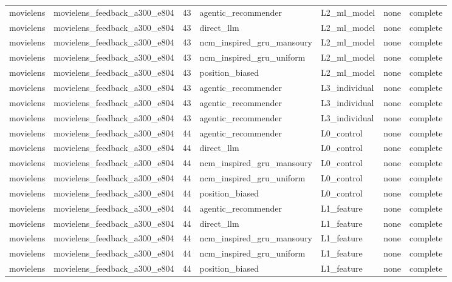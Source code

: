 \begin{table}[htbp!]
\begin{tabular}{llrllll}
movielens & movielens\_feedback\_a300\_e804 & 43 & agentic\_recommender & L2\_ml\_model & none & complete \\
movielens & movielens\_feedback\_a300\_e804 & 43 & direct\_llm & L2\_ml\_model & none & complete \\
movielens & movielens\_feedback\_a300\_e804 & 43 & ncm\_inspired\_gru\_mansoury & L2\_ml\_model & none & complete \\
movielens & movielens\_feedback\_a300\_e804 & 43 & ncm\_inspired\_gru\_uniform & L2\_ml\_model & none & complete \\
movielens & movielens\_feedback\_a300\_e804 & 43 & position\_biased & L2\_ml\_model & none & complete \\
movielens & movielens\_feedback\_a300\_e804 & 43 & agentic\_recommender & L3\_individual & none & complete \\
movielens & movielens\_feedback\_a300\_e804 & 43 & agentic\_recommender & L3\_individual & none & complete \\
movielens & movielens\_feedback\_a300\_e804 & 43 & agentic\_recommender & L3\_individual & none & complete \\
movielens & movielens\_feedback\_a300\_e804 & 44 & agentic\_recommender & L0\_control & none & complete \\
movielens & movielens\_feedback\_a300\_e804 & 44 & direct\_llm & L0\_control & none & complete \\
movielens & movielens\_feedback\_a300\_e804 & 44 & ncm\_inspired\_gru\_mansoury & L0\_control & none & complete \\
movielens & movielens\_feedback\_a300\_e804 & 44 & ncm\_inspired\_gru\_uniform & L0\_control & none & complete \\
movielens & movielens\_feedback\_a300\_e804 & 44 & position\_biased & L0\_control & none & complete \\
movielens & movielens\_feedback\_a300\_e804 & 44 & agentic\_recommender & L1\_feature & none & complete \\
movielens & movielens\_feedback\_a300\_e804 & 44 & direct\_llm & L1\_feature & none & complete \\
movielens & movielens\_feedback\_a300\_e804 & 44 & ncm\_inspired\_gru\_mansoury & L1\_feature & none & complete \\
movielens & movielens\_feedback\_a300\_e804 & 44 & ncm\_inspired\_gru\_uniform & L1\_feature & none & complete \\
movielens & movielens\_feedback\_a300\_e804 & 44 & position\_biased & L1\_feature & none & complete \\

\end{tabular}
\end{table}
